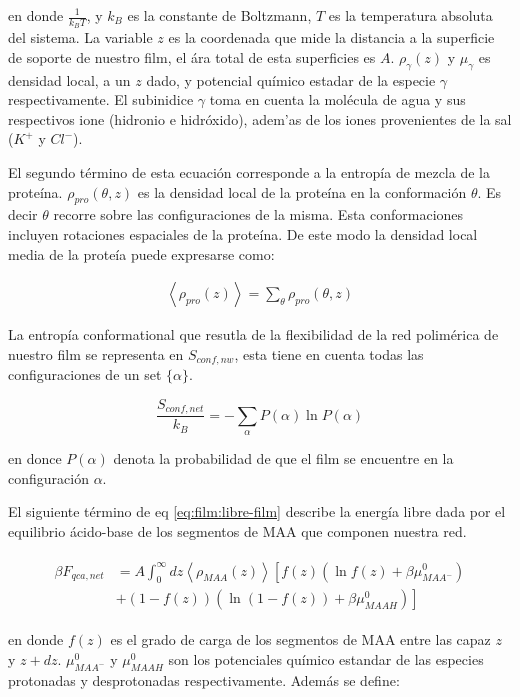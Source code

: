 \noindent en donde $\frac{1}{k_B T}$, y $k_B$ es la constante de Boltzmann, $T$ es la temperatura absoluta del sistema. La variable $z$ es la coordenada que mide la distancia a la superficie de soporte de nuestro film, el \'ara total de esta superficies es $A$. $\rho_\gamma(z)$ y $\mu_\gamma$ es densidad local, a un $z$ dado, y potencial qu\'imico estadar de la especie $\gamma$ respectivamente.
El subinidice $\gamma$ toma en cuenta la mol\'ecula de agua y sus respectivos ione (hidronio e hidr\'oxido), adem'as de los iones provenientes de la sal ($K^+$ y $Cl^-$). 


El segundo t\'ermino de esta ecuaci\'on corresponde a la entrop\'ia de mezcla de la prote\'ina. $\rho_{pro}(\theta,z)$ es la densidad local de la prote\'ina en la conformaci\'on $\theta$. Es decir $\theta$ recorre sobre las configuraciones de la misma.
Esta conformaciones incluyen rotaciones espaciales de la prote\'ina.
De este modo la densidad local media de la prote\'ia puede expresarse como:


\begin{align}
	\left<\rho_{pro}(z)\right> = \sum_\theta{\rho_{pro}(\theta,z)}
\end{align}


La entrop\'ia conformational que resutla de la flexibilidad de la red polim\'erica de nuestro film se representa en $S_{conf, nw}$, esta tiene en cuenta todas las configuraciones de un set $\{\alpha\}$.

\begin{equation}
	\frac{S_{conf,net}}{k_B} = - \sum_{\alpha}{P(\alpha)\ln P(\alpha)}
\end{equation}

\noindent en donce $P(\alpha)$ denota la probabilidad de que el film se encuentre en la configuraci\'on $\alpha$.

El siguiente t\'ermino de eq \ref{eq:film:libre-film} describe  la energ\'ia libre dada por  el equilibrio \'acido-base de los segmentos de MAA que componen nuestra red. 

\begin{align}
	\begin{aligned}
		\beta F_{qca,net} &= A\int_0^\infty dz \left<\rho_{MAA}(z)\right> \left[f(z)(\ln f(z)+ \beta\mu^0_{MAA^-})\right.\\
		&\left.+(1-f(z))(\ln (1-f(z))+\beta\mu^0_{MAAH})\right]    
	\end{aligned}
\end{align} 

\noindent en donde $f(z)$ es el grado de carga de los segmentos de MAA entre las capaz $z$ y $z + dz$. 
$\mu^0_{MAA^-}$ y $\mu^0_{MAAH}$ son los potenciales qu\'imico estandar  de las especies protonadas y desprotonadas respectivamente.
Adem\'as se define:

